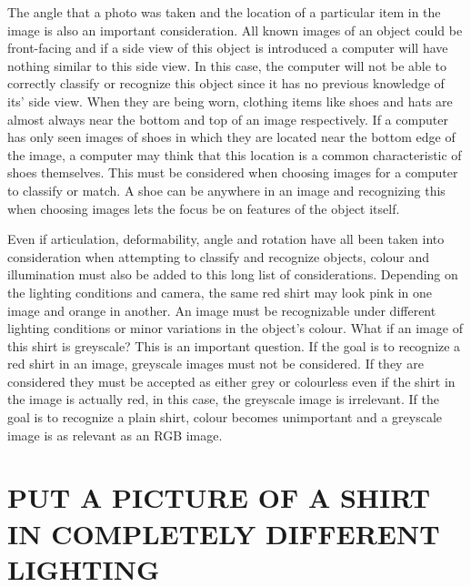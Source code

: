 \documentclass[12pt]{article} %
\begin{document}
	The angle that a photo was taken and the location of a particular item in the image is also an important consideration. All known images of an object could be front-facing and if a side view of this object is introduced a computer will have nothing similar to this side view. In this case, the computer will not be able to correctly classify or recognize this object since it has no previous knowledge of its' side view. When they are being worn, clothing items like shoes and hats are almost always near the bottom and top of an image respectively. If a computer has only seen images of shoes in which they are located near the bottom edge of the image, a computer may think that this location is a common characteristic of shoes themselves. This must be considered when choosing images for a computer to classify or match. A shoe can be anywhere in an image and recognizing this when choosing images lets the focus be on features of the object itself. 
	
	Even if articulation, deformability, angle and rotation have all been taken into consideration when attempting to classify and recognize objects, colour and illumination must also be added to this long list of considerations. Depending on the lighting conditions and camera, the same red shirt may look pink in one image and orange in another. An image must be recognizable under different lighting conditions or minor variations in the object's colour. What if an image of this shirt is greyscale? This is an important question. If the goal is to recognize a red shirt in an image, greyscale images must not be considered. If they are considered they must be accepted as either grey or colourless even if the shirt in the image is actually red, in this case, the greyscale image is irrelevant. If the goal is to recognize a plain shirt, colour becomes unimportant and a greyscale image is as relevant as an RGB image.
	
 \section{PUT A PICTURE OF A SHIRT IN COMPLETELY DIFFERENT LIGHTING}
	
\end{document}

